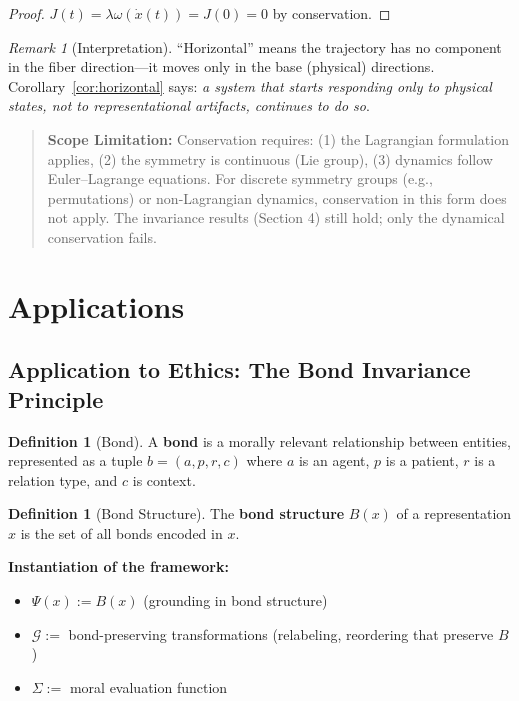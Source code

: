 \documentclass[12pt]{article}
\theoremstyle{definition}
\newtheorem{definition}[theorem]{Definition}
\theoremstyle{remark}
\newtheorem{remark}[theorem]{Remark}
\newcommand{\calG}{\mathcal{G}}
\begin{document}
\begin{proof}
$J(t) = \lambda\omega(\dot{x}(t)) = J(0) = 0$ by conservation.
\end{proof}

\begin{remark}[Interpretation]\label{rem:horizontal}
``Horizontal'' means the trajectory has no component in the
fiber direction---it moves only in the base (physical) directions. Corollary~\ref{cor:horizontal} says: \emph{a system
that starts responding only to physical states, not to representational artifacts, continues to do
so}.
\end{remark}

\begin{quote}
\textbf{Scope Limitation:} Conservation requires: (1) the Lagrangian formulation applies, (2) the
symmetry is continuous (Lie group), (3) dynamics follow Euler--Lagrange equations. For
discrete symmetry groups (e.g., permutations) or non-Lagrangian dynamics, conservation in
this form does not apply. The invariance results (Section 4) still hold; only the dynamical
conservation fails.
\end{quote}

\section{Applications}

\subsection{Application to Ethics: The Bond Invariance Principle}

\begin{definition}[Bond]\label{def:bond}
A \textbf{bond} is a morally relevant relationship between entities, represented
as a tuple $b = (a, p, r, c)$ where $a$ is an agent, $p$ is a patient, $r$ is a relation type, and $c$ is context.
\end{definition}

\begin{definition}[Bond Structure]\label{def:bond-structure}
The \textbf{bond structure} $B(x)$ of a representation $x$ is the set
of all bonds encoded in $x$.
\end{definition}

\textbf{Instantiation of the framework:}
\begin{itemize}
    \item $\Psi(x) := B(x)$ (grounding in bond structure)
    \item $\calG :=$ bond-preserving transformations (relabeling, reordering that preserve $B$)
    \item $\Sigma :=$ moral evaluation function
\end{itemize}
\end{document}
